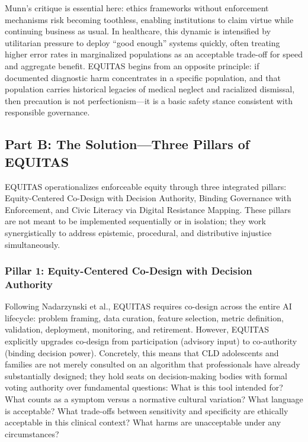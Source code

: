 \documentclass[12pt,letterpaper]{article}
\begin{document}
Munn's critique is essential here: ethics frameworks without enforcement mechanisms risk becoming toothless, enabling institutions to claim virtue while continuing business as usual.\cite{munn_idai700} In healthcare, this dynamic is intensified by utilitarian pressure to deploy ``good enough'' systems quickly, often treating higher error rates in marginalized populations as an acceptable trade-off for speed and aggregate benefit.\cite{munn_idai700} EQUITAS begins from an opposite principle: if documented diagnostic harm concentrates in a specific population, and that population carries historical legacies of medical neglect and racialized dismissal, then precaution is not perfectionism---it is a basic safety stance consistent with responsible governance.\cite{garcia_ed415}

\subsection{Part B: The Solution---Three Pillars of EQUITAS}

EQUITAS operationalizes enforceable equity through three integrated pillars: Equity-Centered Co-Design with Decision Authority, Binding Governance with Enforcement, and Civic Literacy via Digital Resistance Mapping. These pillars are not meant to be implemented sequentially or in isolation; they work synergistically to address epistemic, procedural, and distributive injustice simultaneously.

\subsubsection{Pillar 1: Equity-Centered Co-Design with Decision Authority}

Following Nadarzynski et al., EQUITAS requires co-design across the entire AI lifecycle: problem framing, data curation, feature selection, metric definition, validation, deployment, monitoring, and retirement.\cite{nadarzynski2024} However, EQUITAS explicitly upgrades co-design from participation (advisory input) to co-authority (binding decision power). Concretely, this means that CLD adolescents and families are not merely consulted on an algorithm that professionals have already substantially designed; they hold seats on decision-making bodies with formal voting authority over fundamental questions: What is this tool intended for? What counts as a symptom versus a normative cultural variation? What language is acceptable? What trade-offs between sensitivity and specificity are ethically acceptable in this clinical context? What harms are unacceptable under any circumstances?
\end{document}
